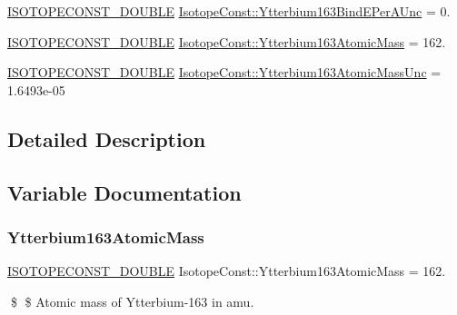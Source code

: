 \begin{DoxyCompactItemize}
\mbox{\hyperlink{group___isotope_const-_macros_ga8f45a7272ce02c0b4c65c44636ed719a}{I\+S\+O\+T\+O\+P\+E\+C\+O\+N\+S\+T\+\_\+\+D\+O\+U\+B\+LE}} \mbox{\hyperlink{group___isotope_const-_ytterbium-_yb163_ga577df9d63a0267cc5695963598622354}{Isotope\+Const\+::\+Ytterbium163\+Bind\+E\+Per\+A\+Unc}} = 0.
\item 
\mbox{\hyperlink{group___isotope_const-_macros_ga8f45a7272ce02c0b4c65c44636ed719a}{I\+S\+O\+T\+O\+P\+E\+C\+O\+N\+S\+T\+\_\+\+D\+O\+U\+B\+LE}} \mbox{\hyperlink{group___isotope_const-_ytterbium-_yb163_ga808711b42538757b58e7b59717a02f4b}{Isotope\+Const\+::\+Ytterbium163\+Atomic\+Mass}} = 162.
\item 
\mbox{\hyperlink{group___isotope_const-_macros_ga8f45a7272ce02c0b4c65c44636ed719a}{I\+S\+O\+T\+O\+P\+E\+C\+O\+N\+S\+T\+\_\+\+D\+O\+U\+B\+LE}} \mbox{\hyperlink{group___isotope_const-_ytterbium-_yb163_gac6a4e741474533cb6d407eeb3d186410}{Isotope\+Const\+::\+Ytterbium163\+Atomic\+Mass\+Unc}} = 1.\+6493e-\/05
\end{DoxyCompactItemize}


\subsection{Detailed Description}


\subsection{Variable Documentation}
\mbox{\label{group___isotope_const-_ytterbium-_yb163_ga808711b42538757b58e7b59717a02f4b}} 
\subsubsection{\texorpdfstring{Ytterbium163\+Atomic\+Mass}{Ytterbium163AtomicMass}}
{\footnotesize\ttfamily \mbox{\hyperlink{group___isotope_const-_macros_ga8f45a7272ce02c0b4c65c44636ed719a}{I\+S\+O\+T\+O\+P\+E\+C\+O\+N\+S\+T\+\_\+\+D\+O\+U\+B\+LE}} Isotope\+Const\+::\+Ytterbium163\+Atomic\+Mass = 162.}

\$ \$ Atomic mass of Ytterbium-\/163 in amu. \mbox{\label{group___isotope_const-_ytterbium-_yb163_gac6a4e741474533cb6d407eeb3d186410}} 
